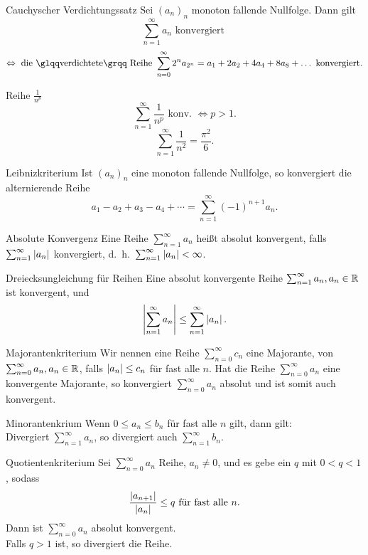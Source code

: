 \documentclass[main.tex]{subfiles}
\begin{document}
\begin{karte}{Cauchyscher Verdichtungssatz}
    Sei \({(a_n)}_n\) monoton fallende 
    Nullfolge. Dann gilt
    \[\sum_{n=1}^{\infty} a_n 
    \text{ konvergiert }\]
    \[\Leftrightarrow \text{ die 
    \gqq{verdichtete} Reihe } 
    \sum_{n=0}^{\infty}2^n a_{2^n} 
    = a_1 + 2a_2 + 4a_4 + 8 a_8 
    + \dots \text{ konvergiert}.\]
\end{karte}
\begin{karte}{Reihe \( \frac{1}{n^p} \)}
    \[ \sum_{n=1}^{\infty} 
    \frac{1}{n^p} \text{ konv. } 
    \Leftrightarrow p>1. \]
    \[ \sum_{n=1}^{\infty} \frac{1}{n^2} 
    = \frac{\pi^2}{6}. \]
\end{karte}
\begin{karte}{Leibnizkriterium}
    Ist \( {(a_n)}_n \) eine monoton 
    fallende Nullfolge, so konvergiert 
    die alternierende Reihe
    \[ a_1 - a_2 + a_3 - a_4 + \cdots 
    = \sum_{n=1}^{\infty} {(-1)}^{n+1} a_n. \]
\end{karte}
\begin{karte}{Absolute Konvergenz}
    Eine Reihe \( \sum_{n=1}^{\infty} a_n \) 
    heißt absolut konvergent, falls 
    \( \sum_{n=1}^{\infty} \left| a_n \right| \) 
    konvergiert, d.\ h.\ 
    \(\sum_{n=1}^{\infty} \left| a_n \right| < \infty \).
\end{karte}
\begin{karte}{Dreiecksungleichung für Reihen}
    Eine absolut konvergente Reihe 
    \( \sum_{n=1}^{\infty}a_n, a_n \in\mathbb{R} \) 
    ist konvergent, und
\[ \left|  \sum_{n=1}^{\infty}a_n  \right|
    \leq \sum_{n=1}^{\infty}\left| a_n \right|.\]
\end{karte}
\begin{karte}{Majorantenkriterium}
    Wir nennen eine Reihe 
    \( \sum_{n=0}^{\infty} c_n \) 
    eine Majorante, von \( \sum_{n=0}^{\infty}
    a_n, a_n\in\mathbb{R} \), falls \( \left| a_n \right| 
    \leq c_n \) für fast alle \(n\).
    Hat die Reihe \( \sum_{n=0}^{\infty}a_n \) 
    eine konvergente Majorante, so konvergiert 
    \( \sum_{n=0}^{\infty}a_n \) absolut und 
    ist somit auch konvergent.
\end{karte}
\begin{karte}{Minorantenkrium}
    Wenn \( 0 \leq a_n \leq b_n \) für fast alle \( n \) 
    gilt, dann gilt:\\
    Divergiert \( \sum_{n=1}^\infty a_n \), so 
    divergiert auch \( \sum_{n=1}^\infty b_n \).
\end{karte}
\begin{karte}{Quotientenkriterium}
    Sei \( \sum_{n=0}^{\infty} a_n \) Reihe, 
    \( a_n\neq 0 \), und es gebe ein \(q\) mit 
    \( 0<q<1 \), sodass
    \[ \frac{\left| a_{n+1} \right|}{\left| a_n \right|} 
    \leq q \text{ für fast alle }n. \]
    Dann ist \( \sum_{n=0}^{\infty} a_n \) 
    absolut konvergent.\\
    Falls \( q > 1 \) ist, so divergiert die 
    Reihe.
\end{karte}
\end{document}

